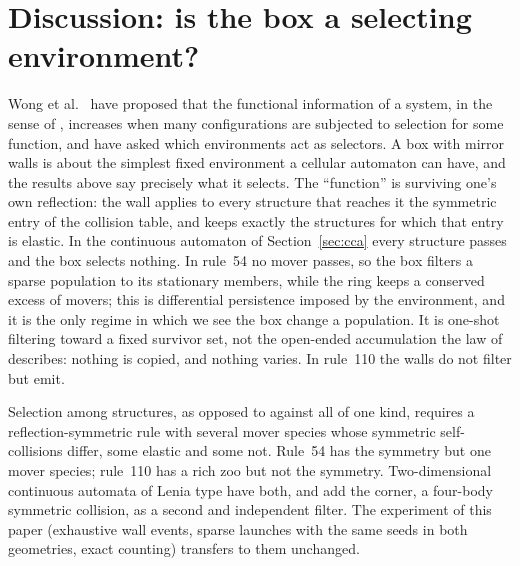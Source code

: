 \documentclass[11pt,a4paper]{article}
\theoremstyle{definition}
\theoremstyle{remark}
\begin{document}
\section{Discussion: is the box a selecting environment?}\label{sec:disc}

Wong et al.\ \cite{Wong2023} have proposed that the functional
information of a system, in the sense of
\cite{Szostak2003,Hazen2007}, increases when many configurations are
subjected to selection for some function, and have asked which
environments act as selectors. A box with mirror walls is about the
simplest fixed environment a cellular automaton can have, and the
results above say precisely what it selects. The ``function'' is
surviving one's own reflection: the wall applies to every structure that
reaches it the symmetric entry of the collision table, and keeps exactly
the structures for which that entry is elastic. In the continuous
automaton of Section~\ref{sec:cca} every structure passes and the box
selects nothing. In rule~54 no mover passes, so the box filters a sparse
population to its stationary members, while the ring keeps a conserved
excess of movers; this is differential persistence imposed by the
environment, and it is the only regime in which we see the box change a
population. It is one-shot filtering toward a fixed survivor set, not
the open-ended accumulation the law of \cite{Wong2023} describes:
nothing is copied, and nothing varies. In rule~110 the walls do not
filter but emit.

Selection among structures, as opposed to against all of one kind,
requires a reflection-symmetric rule with several mover species whose
symmetric self-collisions differ, some elastic and some not. Rule~54 has
the symmetry but one mover species; rule~110 has a rich zoo
\cite{Cook} but not the symmetry. Two-dimensional continuous automata of
Lenia type \cite{Lenia} have both, and add the corner, a four-body
symmetric collision, as a second and independent filter. The experiment
of this paper (exhaustive wall events, sparse launches with the same
seeds in both geometries, exact counting) transfers to them unchanged.
\end{document}
